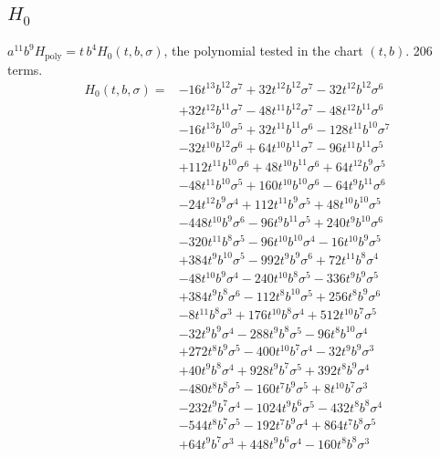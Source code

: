 \subsection*{$H_0$}
$a^{11}b^9H_{\mathrm{poly}}=t\,b^4H_0(t,b,\sigma)$, the polynomial tested in the chart $(t,b)$. 206 terms.
{\small
\begin{align*}
H_0(t,b,\sigma)={}&-16t^{13}b^{12}\sigma^{7}+32t^{12}b^{12}\sigma^{7}-32t^{12}b^{12}\sigma^{6}\\
&+32t^{12}b^{11}\sigma^{7}-48t^{11}b^{12}\sigma^{7}-48t^{12}b^{11}\sigma^{6}\\
&-16t^{13}b^{10}\sigma^{5}+32t^{11}b^{11}\sigma^{6}-128t^{11}b^{10}\sigma^{7}\\
&-32t^{10}b^{12}\sigma^{6}+64t^{10}b^{11}\sigma^{7}-96t^{11}b^{11}\sigma^{5}\\
&+112t^{11}b^{10}\sigma^{6}+48t^{10}b^{11}\sigma^{6}+64t^{12}b^{9}\sigma^{5}\\
&-48t^{11}b^{10}\sigma^{5}+160t^{10}b^{10}\sigma^{6}-64t^{9}b^{11}\sigma^{6}\\
&-24t^{12}b^{9}\sigma^{4}+112t^{11}b^{9}\sigma^{5}+48t^{10}b^{10}\sigma^{5}\\
&-448t^{10}b^{9}\sigma^{6}-96t^{9}b^{11}\sigma^{5}+240t^{9}b^{10}\sigma^{6}\\
&-320t^{11}b^{8}\sigma^{5}-96t^{10}b^{10}\sigma^{4}-16t^{10}b^{9}\sigma^{5}\\
&+384t^{9}b^{10}\sigma^{5}-992t^{9}b^{9}\sigma^{6}+72t^{11}b^{8}\sigma^{4}\\
&-48t^{10}b^{9}\sigma^{4}-240t^{10}b^{8}\sigma^{5}-336t^{9}b^{9}\sigma^{5}\\
&+384t^{9}b^{8}\sigma^{6}-112t^{8}b^{10}\sigma^{5}+256t^{8}b^{9}\sigma^{6}\\
&-8t^{11}b^{8}\sigma^{3}+176t^{10}b^{8}\sigma^{4}+512t^{10}b^{7}\sigma^{5}\\
&-32t^{9}b^{9}\sigma^{4}-288t^{9}b^{8}\sigma^{5}-96t^{8}b^{10}\sigma^{4}\\
&+272t^{8}b^{9}\sigma^{5}-400t^{10}b^{7}\sigma^{4}-32t^{9}b^{9}\sigma^{3}\\
&+40t^{9}b^{8}\sigma^{4}+928t^{9}b^{7}\sigma^{5}+392t^{8}b^{9}\sigma^{4}\\
&-480t^{8}b^{8}\sigma^{5}-160t^{7}b^{9}\sigma^{5}+8t^{10}b^{7}\sigma^{3}\\
&-232t^{9}b^{7}\sigma^{4}-1024t^{9}b^{6}\sigma^{5}-432t^{8}b^{8}\sigma^{4}\\
&-544t^{8}b^{7}\sigma^{5}-192t^{7}b^{9}\sigma^{4}+864t^{7}b^{8}\sigma^{5}\\
&+64t^{9}b^{7}\sigma^{3}+448t^{9}b^{6}\sigma^{4}-160t^{8}b^{8}\sigma^{3}\\

\end{align*}}
